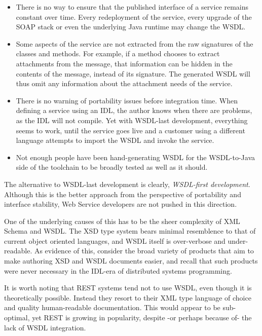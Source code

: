\begin{itemize}

\item
    There is no way to ensure that the published interface of a service
    remains constant over time. Every redeployment of the service, every
    upgrade of the SOAP stack or even the underlying Java runtime may
    change the WSDL.

\item

Some aspects of the service are not extracted from the raw signatures
of the classes and methods. For example, if a method chooses to extract
attachments from the message, that information can be hidden in the contents
of the message, instead of its signature. The generated WSDL will thus
omit any information about the attachment needs of the service.

\item

There is no warning of portability issues before integration time. 
When defining a service using an IDL, the author knows
when there are problems, as the IDL will not compile. Yet with WSDL-last
development, everything seems to work, until the service goes live and
a customer using a different language attempts to import the WSDL and
invoke the service.

\item

Not enough people have been hand-generating WSDL for the WSDL-to-Java
side of the toolchain to be broadly tested as well as it should.

    
\end{itemize}

The alternative to WSDL-last development is clearly, \emph{WSDL-first
development}. Although this is the better approach from the perspective
of portability and interface stability, Web Service developers are not
pushed in this direction.

One of the underlying causes of this has to be the sheer complexity of
XML Schema and WSDL. The XSD type system bears minimal resemblence to
that of current object oriented languages, and WSDL itself is
over-verbose and under-readable. As evidence of this, 
consider the broad variety of products that aim to make authoring XSD
and WSDL documents easier, and recall that such products were never
necessary in the IDL-era of distributed systems programming.

It is worth noting that REST systems \cite{fielding:rest} tend not to
use WSDL, even though it is theoretically possible. Instead they resort
to their XML type language of choice and quality human-readable
documentation. This would appear to be sub-optimal, yet REST is growing
in popularity, despite -or perhaps because of- the lack of WSDL
integration. 

